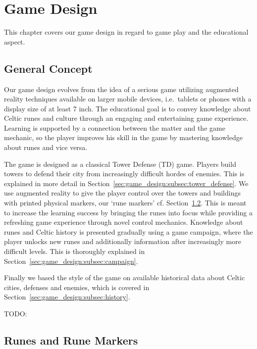 \section{Game Design}
\label{sec:game_design}

This chapter covers our game design in regard to game play and the educational aspect.

\subsection{General Concept}
\label{sec:game_design:subsec:general_concept}

Our game design evolves from the idea of a serious game utilizing augmented reality techniques available on larger mobile devices, i.e.\ tablets or phones with a display size of at least 7 inch.
The educational goal is to convey knowledge about Celtic runes and culture through an engaging and entertaining game experience.
Learning is supported by a connection between the matter and the game mechanic, so the player improves his skill in the game by mastering knowledge about runes and vice versa.

The game is designed as a classical Tower Defense (TD) game. Players build towers to defend their city from increasingly difficult hordes of enemies.
This is explained in more detail in Section~\ref{sec:game_design:subsec:tower_defense}.
We use augmented reality to give the player control over the towers and buildings with printed physical markers, our `rune markers' cf. Section~\ref{sec:game_design:subsec:runes}.
This is meant to increase the learning success by bringing the runes into focus while providing a refreshing game experience through novel control mechanics.
Knowledge about runes and Celtic history is presented gradually using a game campaign, where the player unlocks new runes and additionally information after increasingly more difficult levels. This is thoroughly explained in Section~\ref{sec:game_design:subsec:campaign}.

Finally we based the style of the game on available historical data about Celtic cities, defenses and enemies, which is covered in Section~\ref{sec:game_design:subsec:history}.

TODO: 

\subsection{Runes and Rune Markers}
\label{sec:game_design:subsec:runes}

